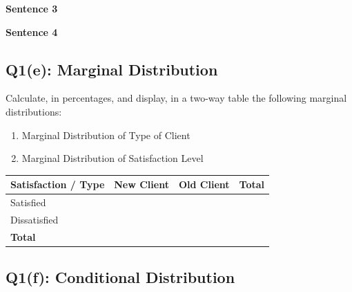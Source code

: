 \documentclass[
  11pt,
  oneside]{scrbook}
\begin{document}
\begin{answerbox}\vspace{3cm}\end{answerbox}

\textbf{Sentence 3}

\begin{answerbox}\vspace{3cm}\end{answerbox}

\textbf{Sentence 4}

\begin{answerbox}\vspace{3cm}\end{answerbox}

\subsection*{Q1(e): Marginal Distribution}\label{q1e-marginal-distribution}

Calculate, in percentages, and display, in a two-way table the following marginal
distributions:

\begin{enumerate}
\def\labelenumi{\roman{enumi}.}
\item
  Marginal Distribution of Type of Client
\item
  Marginal Distribution of Satisfaction Level
\end{enumerate}

\begin{table}[h!]
\centering
\renewcommand{\arraystretch}{3} %


\begin{tabular}{|l|c|c|c|}
\hline
\textbf{Satisfaction / Type} & \textbf{New Client} & \textbf{Old Client} & \textbf{Total} \\
\hline
Satisfied 
  & \cellcolor{lightgray} 
  & \cellcolor{lightgray} 
  &  \\
\hline
Dissatisfied 
  & \cellcolor{lightgray} 
  & \cellcolor{lightgray} 
  &  \\
\hline
\textbf{Total} 
  &  
  &  
  &  \\
\hline
\end{tabular}
\end{table}

\subsection*{Q1(f): Conditional Distribution}\label{q1f-conditional-distribution}
\end{document}
